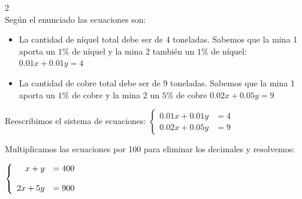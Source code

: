 \documentclass[11pt]{article}
\newcommand{\indicador}[4]{
{\tikz[remember picture,overlay]\coordinate (#1) at #2;}{\tikz[remember picture,overlay]\coordinate (#3) at #4;} 
}
\newcommand{\marka}[2]{
{\tikz[remember picture,overlay]\coordinate (#1) at #2;}
}
\begin{document}
\begin{enumerate}[\hspace{-7mm} 1) ]
\begin{enumerate}[a) ]
\begin{multicols}{2}
\, \\ 

\columnbreak %
Según el enunciado las ecuaciones son:

\begin{itemize}
    \item La cantidad de níquel total debe ser de 4 toneladas. Sabemos que la mina 1 aporta un $1\%$ de níquel y la mina 2 también un $1\%$ de níquel:
    $0.01x + 0.01y = 4$
    
    \item La cantidad de cobre total debe ser de 9 toneladas. Sabemos que la mina 1 aporta un $1\%$ de cobre y la mina 2 un $5\%$ de cobre
    $0.02x + 0.05y = 9$
\end{itemize}

\end{multicols}


\medskip


Reescribimos el sistema de ecuaciones: \quad $\left\{\begin{array}{rl}
    0.01x + 0.01y &= 4 \\[4mm]
    0.02x + 0.05y &= 9
\end{array}\right.$

Multiplicamos las ecuaciones por 100 para eliminar los decimales y resolvemos: 

\medskip 

$\left\{\begin{array}{rl}
    x + y &= 400 \indicador{x}{(.1,.15)}{y}{(1.3,.15)}
    \\[4mm]
    2x + 5y &= 900 \marka{a}{(.1,.15)}
\end{array}\right.$




\end{enumerate}
\end{enumerate}
\end{document}
